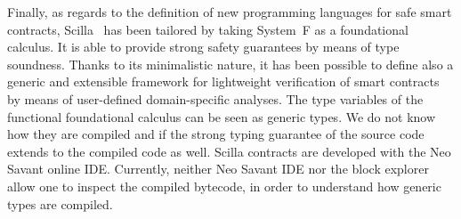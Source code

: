 Finally, as regards to the definition of new programming languages for safe smart contracts,
Scilla~\cite{scilla} has been tailored by taking System~F as a foundational calculus.
It is able to provide strong safety guarantees by means of type soundness.
Thanks to its minimalistic nature, it has been possible to define also a generic and extensible
framework for lightweight verification of smart contracts by means of user-defined domain-specific
analyses. The type variables of the functional foundational calculus can be seen as
generic types. We do not know how they are compiled and if the strong typing guarantee of the
source code extends to the compiled code as well. Scilla contracts are developed with
the Neo Savant online IDE. Currently, neither Neo Savant IDE nor the block explorer
allow one to inspect the compiled bytecode, in order to understand how generic types are compiled.

